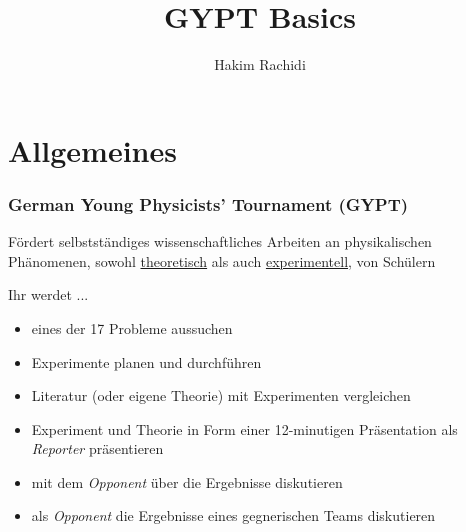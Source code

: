 \documentclass[9pt]{beamer}
\author{Hakim Rachidi}
\title{GYPT Basics}
\begin{document}
\begin{frame}
\titlepage
\end{frame}

\section{Allgemeines}

\begin{frame}
\frametitle{German Young Physicists' Tournament (GYPT)}


\begin{center}
{\large Fördert \color{orange} selbstständiges \color{blue}wissenschaftliches \color{black} Arbeiten an physikalischen Phänomenen, sowohl \underline{theoretisch} als auch \underline{experimentell}, von Schülern}
\end{center}
\pause
\vfill

Ihr werdet ...
\begin{itemize}
\item eines der 17 Probleme aussuchen
\item Experimente planen und durchführen
\item Literatur (oder eigene Theorie) mit Experimenten vergleichen
\item Experiment und Theorie in Form einer 12-minutigen Präsentation als \emph{Reporter} präsentieren
\item mit dem \emph{Opponent} über die Ergebnisse diskutieren
\item als \emph{Opponent} die Ergebnisse eines gegnerischen Teams diskutieren
\end{itemize}
\end{frame}
\end{document}
